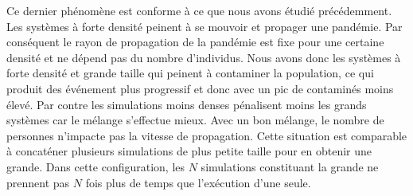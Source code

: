 Ce dernier phénomène est conforme à ce que nous avons étudié précédemment. Les systèmes à forte densité peinent à se mouvoir et propager une pandémie. Par conséquent le rayon de propagation de la pandémie est fixe pour une certaine densité et ne dépend pas du nombre d'individus. Nous avons donc les systèmes à forte densité et grande taille qui peinent à contaminer la population, ce qui produit des événement plus progressif et donc avec un pic de contaminés moins élevé. Par contre les simulations moins denses pénalisent moins les grands systèmes car le mélange s'effectue mieux. Avec un bon mélange, le nombre de personnes n'impacte pas la vitesse de propagation. Cette situation est comparable à concaténer plusieurs simulations de plus petite taille pour en obtenir une grande. Dans cette configuration, les $N$ simulations constituant la grande ne prennent pas $N$ fois plus de temps que l'exécution d'une seule.
